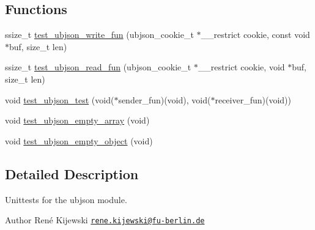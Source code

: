 \subsection*{Functions}
\begin{DoxyCompactItemize}
\item 
ssize\+\_\+t \hyperlink{group__unittests_ga53e6c1e17347b7fa039be7245a0c76bf}{test\+\_\+ubjson\+\_\+write\+\_\+fun} (ubjson\+\_\+cookie\+\_\+t $\ast$\+\_\+\+\_\+restrict cookie, const void $\ast$buf, size\+\_\+t len)
\item 
ssize\+\_\+t \hyperlink{group__unittests_ga8035b33fdb669d1d31033f41e4d7e291}{test\+\_\+ubjson\+\_\+read\+\_\+fun} (ubjson\+\_\+cookie\+\_\+t $\ast$\+\_\+\+\_\+restrict cookie, void $\ast$buf, size\+\_\+t len)
\item 
void \hyperlink{group__unittests_gac5fe0b001cb96b33aaf4f1b52f7d38e9}{test\+\_\+ubjson\+\_\+test} (void($\ast$sender\+\_\+fun)(void), void($\ast$receiver\+\_\+fun)(void))
\item 
void \hyperlink{group__unittests_ga9da1a8e30a96a87edc4a759e4742b998}{test\+\_\+ubjson\+\_\+empty\+\_\+array} (void)
\item 
void \hyperlink{group__unittests_ga770a7e979bea402d2c2b99bded276d67}{test\+\_\+ubjson\+\_\+empty\+\_\+object} (void)
\end{DoxyCompactItemize}


\subsection{Detailed Description}
Unittests for the {\ttfamily ubjson} module. 

\begin{DoxyAuthor}{Author}
René Kijewski \href{mailto:rene.kijewski@fu-berlin.de}{\tt rene.\+kijewski@fu-\/berlin.\+de} 
\end{DoxyAuthor}

